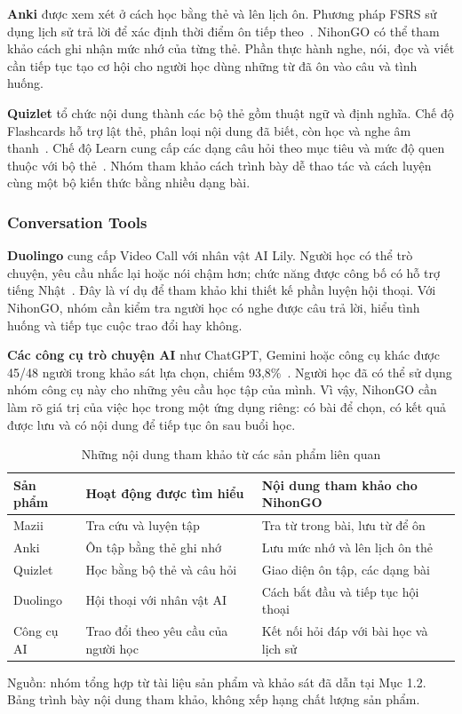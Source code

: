 \textbf{Anki} được xem xét ở cách học bằng thẻ và lên lịch ôn. Phương pháp FSRS sử dụng lịch sử trả lời để xác định thời điểm ôn tiếp theo~\cite{anki-scheduler}. NihonGO có thể tham khảo cách ghi nhận mức nhớ của từng thẻ. Phần thực hành nghe, nói, đọc và viết cần tiếp tục tạo cơ hội cho người học dùng những từ đã ôn vào câu và tình huống.

\textbf{Quizlet} tổ chức nội dung thành các bộ thẻ gồm thuật ngữ và định nghĩa. Chế độ Flashcards hỗ trợ lật thẻ, phân loại nội dung đã biết, còn học và nghe âm thanh~\cite{quizlet-flashcards}. Chế độ Learn cung cấp các dạng câu hỏi theo mục tiêu và mức độ quen thuộc với bộ thẻ~\cite{quizlet-learn}. Nhóm tham khảo cách trình bày dễ thao tác và cách luyện cùng một bộ kiến thức bằng nhiều dạng bài.

\subsubsection{Conversation Tools}

\textbf{Duolingo} cung cấp Video Call với nhân vật AI Lily. Người học có thể trò chuyện, yêu cầu nhắc lại hoặc nói chậm hơn; chức năng được công bố có hỗ trợ tiếng Nhật~\cite{duolingo-videocall}. Đây là ví dụ để tham khảo khi thiết kế phần luyện hội thoại. Với NihonGO, nhóm cần kiểm tra người học có nghe được câu trả lời, hiểu tình huống và tiếp tục cuộc trao đổi hay không.

\textbf{Các công cụ trò chuyện AI} như ChatGPT, Gemini hoặc công cụ khác được 45/48 người trong khảo sát lựa chọn, chiếm 93,8\%~\cite{nihongo-survey2026}. Người học đã có thể sử dụng nhóm công cụ này cho những yêu cầu học tập của mình. Vì vậy, NihonGO cần làm rõ giá trị của việc học trong một ứng dụng riêng: có bài để chọn, có kết quả được lưu và có nội dung để tiếp tục ôn sau buổi học.

\begin{table}[htbp]
  \centering
  \caption{Những nội dung tham khảo từ các sản phẩm liên quan}
  \label{tab:related-product-tasks}
  \begin{tabular}{@{}p{2.1cm}p{5.6cm}p{6.7cm}@{}}
    \toprule
    \textbf{Sản phẩm} & \textbf{Hoạt động được tìm hiểu} & \textbf{Nội dung tham khảo cho NihonGO} \\
    \midrule
    Mazii & Tra cứu và luyện tập & Tra từ trong bài, lưu từ để ôn \\
    Anki & Ôn tập bằng thẻ ghi nhớ & Lưu mức nhớ và lên lịch ôn thẻ \\
    Quizlet & Học bằng bộ thẻ và câu hỏi & Giao diện ôn tập, các dạng bài \\
    Duolingo & Hội thoại với nhân vật AI & Cách bắt đầu và tiếp tục hội thoại \\
    Công cụ AI & Trao đổi theo yêu cầu của người học & Kết nối hỏi đáp với bài học và lịch sử \\
    \bottomrule
  \end{tabular}
  \par\smallskip
  {\fontsize{11pt}{14pt}\selectfont Nguồn: nhóm tổng hợp từ tài liệu sản phẩm và khảo sát đã dẫn tại Mục 1.2. Bảng trình bày nội dung tham khảo, không xếp hạng chất lượng sản phẩm.\par}
\end{table}

